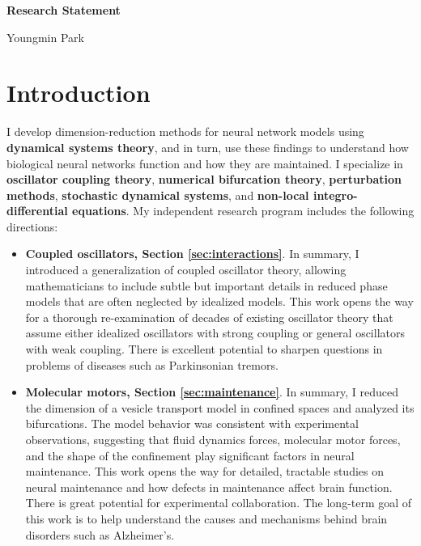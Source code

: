 \documentclass[a4paper,11pt]{article}
\begin{document}
\begin{center}
\Large \textbf{Research Statement}

\Large Youngmin Park
\end{center}


\section{Introduction}

I develop dimension-reduction methods for neural network models using \textbf{dynamical systems theory}, and in turn, use these findings to understand how biological neural networks function and how they are maintained. I specialize in \textbf{oscillator coupling theory}, \textbf{numerical bifurcation theory}, \textbf{perturbation methods}, \textbf{stochastic dynamical systems}, and \textbf{non-local integro-differential equations}. My independent research program includes the following directions:
\begin{itemize}
	\item \textbf{Coupled oscillators, Section \ref{sec:interactions}}. In summary, I introduced a generalization of coupled oscillator theory, allowing mathematicians to include subtle but important details in reduced phase models that are often neglected by idealized models. This work opens the way for a thorough re-examination of decades of existing oscillator theory that assume either idealized oscillators with strong coupling or general oscillators with weak coupling. There is excellent potential to sharpen questions in problems of diseases such as Parkinsonian tremors.
	\item \textbf{Molecular motors, Section \ref{sec:maintenance}}. In summary, I reduced the dimension of a vesicle transport model in confined spaces and analyzed its bifurcations. The model behavior was consistent with experimental observations, suggesting that fluid dynamics forces, molecular motor forces, and the shape of the confinement play significant factors in neural maintenance. This work opens the way for detailed, tractable studies on neural maintenance and how defects in maintenance affect brain function. There is great potential for experimental collaboration. The long-term goal of this work is to help understand the causes and mechanisms behind  brain disorders such as Alzheimer's.
\end{itemize}
\end{document}
